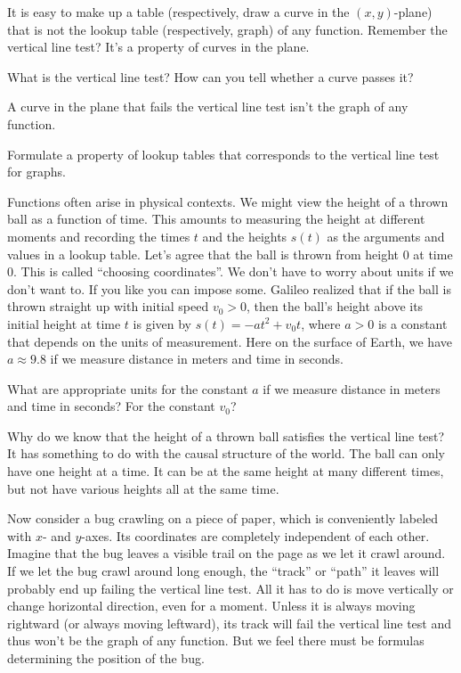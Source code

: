 \documentclass[11pt]{amsart}
\begin{document}
It is easy to make up a table (respectively, draw a curve in the $(x,y)$-plane) that is not the lookup table (respectively, graph) of any function. Remember the vertical line test? It's a property of curves in the plane.
\begin{discussionquestion}
	What is the vertical line test? How can you tell whether a curve passes it?
\end{discussionquestion}
A curve in the plane that fails the vertical line test isn't the graph of any function.
\begin{discussionquestion}
	Formulate a property of lookup tables that corresponds to the vertical line test for graphs.
\end{discussionquestion}
Functions often arise in physical contexts. We might view the height of a thrown ball as a function of time. This amounts to measuring the height at different moments and recording the times $t$ and the heights $s(t)$ as the arguments and values in a lookup table. Let's agree that the ball is thrown from height $0$ at time $0$. This is called ``choosing coordinates''. We don't have to worry about units if we don't want to. If you like you can impose some. Galileo realized that if the ball is thrown straight up with initial speed $v_0 > 0$, then the ball's height above its initial height at time $t$ is given by $s(t) = -at^2 + v_0 t$, where $a > 0$ is a constant that depends on the units of measurement. Here on the surface of Earth, we have $a \approx 9.8$ if we measure distance in meters and time in seconds.
\begin{discussionquestion}
 	What are appropriate units for the constant $a$ if we measure distance in meters and time in seconds? For the constant $v_0$?
\end{discussionquestion}
Why do we know that the height of a thrown ball satisfies the vertical line test? It has something to do with the causal structure of the world. The ball can only have one height at a time. It can be at the same height at many different times, but not have various heights all at the same time.

Now consider a bug crawling on a piece of paper, which is conveniently labeled with $x$- and $y$-axes. Its coordinates are completely independent of each other. Imagine that the bug leaves a visible trail on the page as we let it crawl around. If we let the bug crawl around long enough, the ``track'' or ``path'' it leaves will probably end up failing the vertical line test. All it has to do is move vertically or change horizontal direction, even for a moment. Unless it is always moving rightward (or always moving leftward), its track will fail the vertical line test and thus won't be the graph of any function. But we feel there must be formulas determining the position of the bug.
\end{document}
